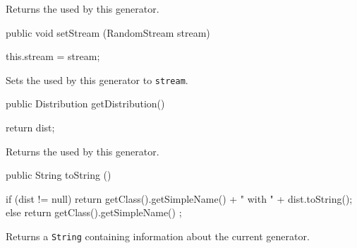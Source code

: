   \begin{tabb}  Returns the  used by this generator.
 \end{tabb}
\begin{htmlonly}
\end{htmlonly}
\begin{code}

   public void setStream (RandomStream stream)\begin{hide} {
      this.stream = stream;
   }\end{hide}
\end{code}
\begin{tabb}
   Sets the  used by this generator to \texttt{stream}.
\end{tabb}
\begin{code}

   public Distribution getDistribution() \begin{hide} {
      return dist;
   }\end{hide}
\end{code}
\begin{tabb}
  Returns the  used by this generator.
\end{tabb}
\begin{htmlonly}
\end{htmlonly}
\begin{code}

   public String toString ()\begin{hide} {
      if (dist != null)
         return getClass().getSimpleName() + " with  " + dist.toString();
      else
         return getClass().getSimpleName() ;
   }\end{hide}
\end{code}
\begin{tabb}
   Returns a \texttt{String} containing information about the current generator.
\end{tabb}

\begin{code}\begin{hide}
}\end{hide}
\end{code}
